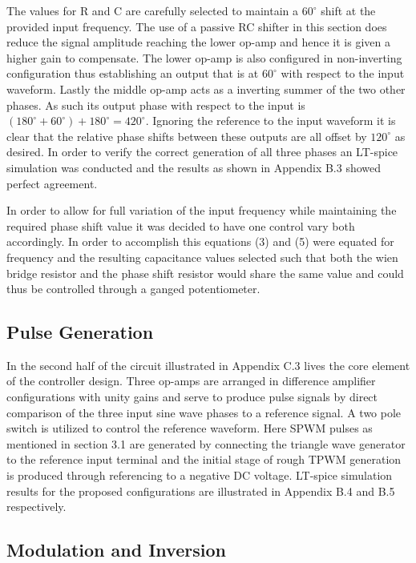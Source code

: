 \documentclass[12pt]{article}
\begin{document}
The values for R and C are carefully selected to maintain a $60^{\circ}$ shift at the provided input frequency. The use of a passive RC shifter in this section does reduce the signal amplitude reaching the lower op-amp and hence it is given a higher gain to compensate. The lower op-amp is also configured in non-inverting configuration thus establishing an output that is at $60^{\circ}$ with respect to the input waveform. Lastly the middle op-amp acts as a inverting summer of the two other phases. As such its output phase with respect to the input is $ (180^{\circ}+60^{\circ})+180^{\circ}=420^{\circ}$. Ignoring the reference to the input waveform it is clear that the relative phase shifts between these outputs are all offset by $120^{\circ}$ as desired. In order to verify the correct generation of all three phases an LT-spice simulation was conducted and the results as shown in Appendix B.3 showed perfect agreement.

In order to allow for full variation of the input frequency while maintaining the required phase shift value it was decided to have one control vary both accordingly. In order to accomplish this equations (3) and (5) were equated for frequency and the resulting capacitance values selected such that both the wien bridge resistor and the phase shift resistor would share the same value and could thus be controlled through a ganged potentiometer.

\subsection{Pulse Generation}%

In the second half of the circuit illustrated in Appendix C.3 lives the core element of the controller design. Three op-amps are arranged in difference amplifier configurations with unity gains and serve to produce pulse signals by direct comparison of the three input sine wave phases to a reference signal. A two pole switch is utilized to control the reference waveform. Here SPWM pulses as mentioned in section 3.1 are generated by connecting the triangle wave generator to the reference input terminal and the initial stage of rough TPWM generation is produced through referencing to a negative DC voltage. LT-spice simulation results for the proposed configurations are illustrated in Appendix B.4 and B.5 respectively.

\subsection{Modulation and Inversion}%
\end{document}
